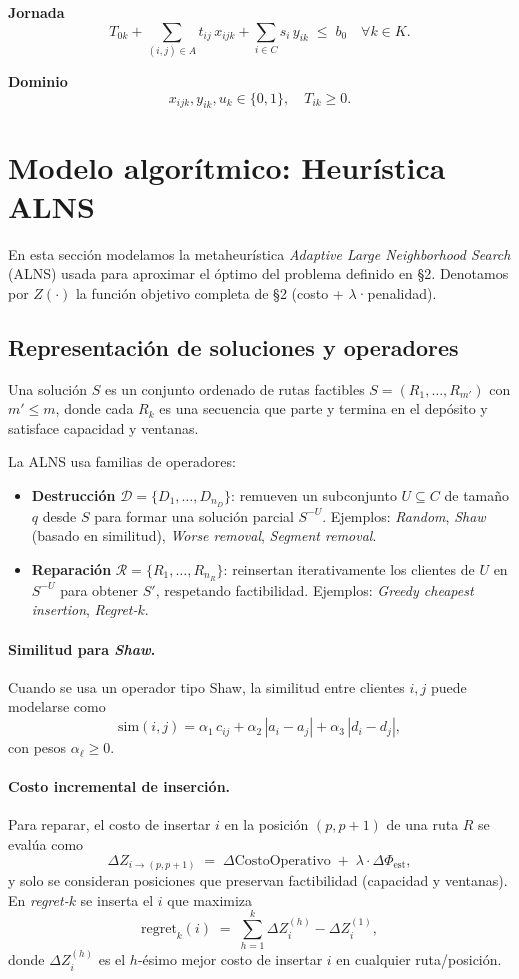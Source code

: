 \documentclass[11pt, a4paper]{article}
\begin{document}
\textbf{Jornada}
\[
T_{0k} + \sum_{(i,j)\in A} t_{ij}\,x_{ijk} + \sum_{i\in C} s_i\,y_{ik} \;\le\; b_0
\quad \forall k\in K.
\]

\textbf{Dominio}
\[
x_{ijk},y_{ik},u_k\in\{0,1\},\quad T_{ik}\ge 0.
\]

\section{Modelo algorítmico: Heurística ALNS}

En esta sección modelamos la metaheurística \emph{Adaptive Large Neighborhood Search} (ALNS) usada para aproximar el óptimo del problema definido en \S2. Denotamos por $Z(\cdot)$ la función objetivo completa de \S2 (costo + $\lambda$·penalidad).

\subsection{Representación de soluciones y operadores}
Una solución $S$ es un conjunto ordenado de rutas factibles $S=(R_1,\dots,R_{m'})$ con $m'\le m$, donde cada $R_k$ es una secuencia que parte y termina en el depósito y satisface capacidad y ventanas.

La ALNS usa familias de operadores:
\begin{itemize}[leftmargin=1.4em]
\item \textbf{Destrucción} $\mathcal{D}=\{D_1,\dots,D_{n_D}\}$: remueven un subconjunto $U\subseteq C$ de tamaño $q$ desde $S$ para formar una solución parcial $S^{-U}$. Ejemplos: \emph{Random}, \emph{Shaw} (basado en similitud), \emph{Worse removal}, \emph{Segment removal}.
\item \textbf{Reparación} $\mathcal{R}=\{R_1,\dots,R_{n_R}\}$: reinsertan iterativamente los clientes de $U$ en $S^{-U}$ para obtener $S'$, respetando factibilidad. Ejemplos: \emph{Greedy cheapest insertion}, \emph{Regret-$k$}.
\end{itemize}

\paragraph{Similitud para \emph{Shaw}.}
Cuando se usa un operador tipo Shaw, la similitud entre clientes $i,j$ puede modelarse como
\[
\mathrm{sim}(i,j)=\alpha_1\,c_{ij}
+ \alpha_2\,|a_i-a_j|
+ \alpha_3\,|d_i-d_j|,
\]
con pesos $\alpha_\ell\ge 0$.

\paragraph{Costo incremental de inserción.}
Para reparar, el costo de insertar $i$ en la posición $(p,p{+}1)$ de una ruta $R$ se evalúa como
\[
\Delta Z_{i\to (p,p+1)} \;=\; \Delta\text{CostoOperativo} \;+\; \lambda\cdot\Delta\Phi_{\text{est}},
\]
y solo se consideran posiciones que preservan factibilidad (capacidad y ventanas). En \emph{regret-$k$} se inserta el $i$ que maximiza
\[
\mathrm{regret}_k(i)\;=\;\sum_{h=1}^{k}\Delta Z_{i}^{(h)}-\Delta Z_{i}^{(1)},
\]
donde $\Delta Z_{i}^{(h)}$ es el $h$-ésimo mejor costo de insertar $i$ en cualquier ruta/posición.
\end{document}
